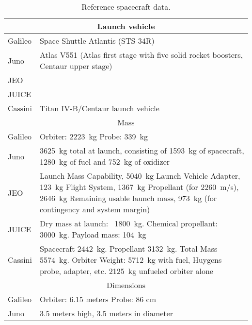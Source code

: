 \begin{longtable}{lp{}}
  \caption{Reference spacecraft data.} \\ \toprule

  \multicolumn{2}{c}{Launch vehicle} \\ \midrule

  Galileo & Space Shuttle Atlantis (STS-34R) \\

  Juno & Atlas V551 (Atlas first stage with five solid rocket
  boosters, Centaur upper stage) \\

  JEO & \\

  JUICE & \\

  Cassini & Titan IV-B/Centaur launch vehicle \\

  \multicolumn{2}{c}{Mass} \\ \midrule

  Galileo & Orbiter: \SI{2223}{kg} Probe: \SI{339}{kg} \\

  Juno & \SI{3625}{kg} total at launch, consisting of \SI{1593}{kg} of
  spacecraft, \SI{1280}{kg} of fuel and \SI{752}{kg} of oxidizer \\

  JEO & Launch Mass Capability, \SI{5040}{kg} Launch Vehicle Adapter,
  \SI{123}{kg} Flight System, \SI{1367}{kg} Propellant (for
  \SI{2260}{m/s}), \SI{2646}{kg} Remaining usable launch mass,
  \SI{973}{kg} (for contingency and system margin) \\

  JUICE & Dry mass at launch: ~\SI{1800}{kg}. Chemical propellant:
  \SI{3000}{kg}. Payload mass: \SI{104}{kg} \\

  Cassini & Spacecraft \SI{2442}{kg}. Propellant \SI{3132}{kg}. Total
  Mass \SI{5574}{kg}. Orbiter Weight: \SI{5712}{kg} with fuel, Huygens
  probe, adapter, etc. \SI{2125}{kg} unfueled orbiter alone \\

  \multicolumn{2}{c}{Dimensions} \\ \midrule

  Galileo & Orbiter: 6.15 meters Probe: 86 cm \\

  Juno & 3.5 meters high, 3.5 meters in diameter \\


\end{longtable}

